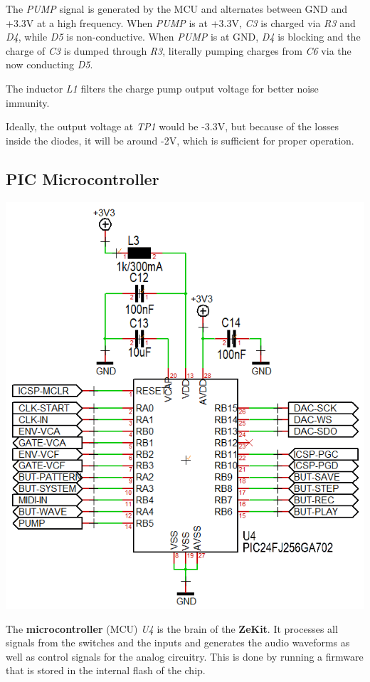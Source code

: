 \documentclass{scrartcl}
\begin{document}
The \emph{PUMP} signal is generated by the MCU and alternates between GND and +3.3V at a high frequency. When \emph{PUMP} is at +3.3V, \emph{C3} is charged via \emph{R3} and \emph{D4}, while \emph{D5} is non-conductive. When \emph{PUMP} is at GND, \emph{D4} is blocking and the charge of \emph{C3} is dumped through \emph{R3}, literally pumping charges from \emph{C6} via the now conducting \emph{D5}.

The inductor \emph{L1} filters the charge pump output voltage for better noise immunity.

Ideally, the output voltage at \emph{TP1} would be -3.3V, but because of the losses inside the diodes, it will be around -2V, which is sufficient for proper operation.

\subsection{PIC Microcontroller}

\begin{center}
    \includegraphics[scale=0.50]{assets/schema-mcu.png}
\end{center}

The \textbf{microcontroller} (MCU) \emph{U4} is the brain of the \textbf{ZeKit}. It processes all signals from the switches and the inputs and generates the audio waveforms as well as control signals for the analog circuitry. This is done by running a firmware that is stored in the internal flash of the chip.
\end{document}
